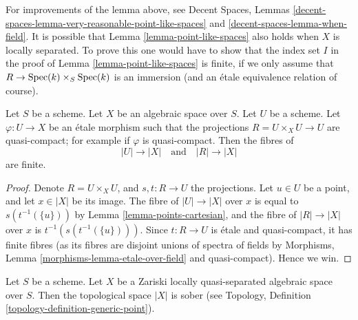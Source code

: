 \begin{remark}
\label{remark-cannot-decide-yet}
For improvements of the lemma above, see
Decent Spaces, Lemmas
\ref{decent-spaces-lemma-very-reasonable-point-like-spaces} and
\ref{decent-spaces-lemma-when-field}.
It is possible that
Lemma \ref{lemma-point-like-spaces}
also holds when $X$ is locally separated. To prove this one would
have to show that the index set $I$ in the proof of
Lemma \ref{lemma-point-like-spaces}
is finite, if we only assume that
$R \to \mathop{\rm Spec}(k) \times_S \mathop{\rm Spec}(k)$ is an immersion (and an \'etale
equivalence relation of course).
\end{remark}

\begin{lemma}
\label{lemma-finite-fibres-presentation}
Let $S$ be a scheme.
Let $X$ be an algebraic space over $S$.
Let $U$ be a scheme. Let $\varphi : U \to X$ be an \'etale morphism such that
the projections $R = U \times_X U \to U$ are quasi-compact; for example if
$\varphi$ is quasi-compact. Then the fibres of
$$
|U| \to |X|
\quad\text{and}\quad
|R| \to |X|
$$
are finite.
\end{lemma}

\begin{proof}
Denote $R = U \times_X U$, and $s, t : R \to U$ the projections.
Let $u \in U$ be a point, and let $x \in |X|$ be its image.
The fibre of $|U| \to |X|$ over $x$ is equal to
$s(t^{-1}(\{u\}))$ by
Lemma \ref{lemma-points-cartesian},
and the fibre of $|R| \to |X|$ over $x$ is $t^{-1}(s(t^{-1}(\{u\})))$.
Since $t : R \to U$ is \'etale and quasi-compact, it has finite fibres
(as its fibres are disjoint unions of spectra of fields by
Morphisms, Lemma \ref{morphisms-lemma-etale-over-field}
and quasi-compact). Hence we win.
\end{proof}

\begin{lemma}
\label{lemma-quasi-separated-sober}
Let $S$ be a scheme. Let $X$ be a Zariski locally quasi-separated
algebraic space over $S$. Then the topological space $|X|$ is sober (see
Topology, Definition \ref{topology-definition-generic-point}).
\end{lemma}

